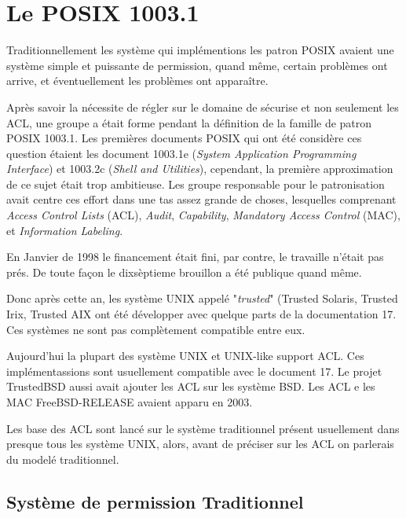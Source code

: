 \section*{Le POSIX 1003.1}


Traditionnellement les système qui implémentions les patron POSIX avaient une système simple et puissante de permission, quand même, certain problèmes ont arrive, et éventuellement les problèmes ont apparaître. 

Après savoir la nécessite de régler sur le domaine de sécurise et non seulement les ACL, une groupe a était forme pendant la définition de la famille de patron POSIX 1003.1. Les premières documents POSIX qui ont été considère ces question étaient les document 1003.1e (\emph{System Application Programming Interface}) et 1003.2c (\emph{Shell and Utilities}), cependant, la première approximation de ce sujet était trop ambitieuse. Les groupe responsable pour le patronisation avait centre ces effort dans une tas assez grande de choses, lesquelles  comprenant \emph{Access Control Lists} (ACL), \emph{Audit}, \emph{Capability},\emph{ Mandatory Access Control }(MAC), et \emph{Information Labeling}\cite{aclsuse}.

En Janvier de 1998\cite{aclsuse} le financement était fini, par contre, le travaille n'était pas prés. De toute façon le dixsèptieme brouillon a été publique quand même\cite{posix17}.

Donc après cette an, les système UNIX appelé "\emph{trusted}" (Trusted Solaris, Trusted Irix, Trusted AIX ont été développer avec quelque parts de la documentation 17. Ces systèmes ne sont pas complètement compatible entre eux. 

Aujourd'hui la plupart des système UNIX et UNIX-like support ACL. Ces implémentassions sont usuellement compatible avec le document 17. Le projet TrustedBSD aussi avait ajouter les ACL sur les système BSD. Les ACL e les MAC  FreeBSD-RELEASE avaient apparu en 2003.

Les base des ACL sont lancé sur le système traditionnel présent usuellement dans presque tous les système UNIX, alors, avant de préciser sur les ACL on parlerais du modelé traditionnel.

\subsection*{Système de permission Traditionnel}

